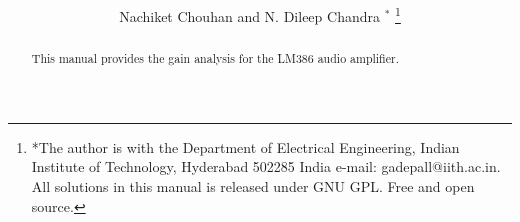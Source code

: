 \documentclass[journal,12pt,twocolumn]{IEEEtran}
\renewcommand\thesection{\arabic{section}}
\begin{document}
\makeatletter
{}
\makeatother
\let\StandardTheFigure\thefigure
\renewcommand{\thefigure}{\thesection}
\makeatletter
{}
\makeatother
\let\StandardTheFigure\thefigure
\let\StandardTheTable\thetable
\let\vec\mathbf
\def\putbox#1#2#3{\makebox[0in][l]{\makebox[#1][l]{}\raisebox{\baselineskip}[0in][0in]{\raisebox{#2}[0in][0in]{#3}}}}
     \def\rightbox#1{\makebox[0in][r]{#1}}
     \def\centbox#1{\makebox[0in]{#1}}
     \def\topbox#1{\raisebox{-\baselineskip}[0in][0in]{#1}}
     \def\midbox#1{\raisebox{-0.5\baselineskip}[0in][0in]{#1}}
\vspace{3cm}
\title{ 
}
\author{ Nachiket Chouhan and N. Dileep Chandra $^{*}$%
	\thanks{*The author is with the Department
		of Electrical Engineering, Indian Institute of Technology, Hyderabad
		502285 India e-mail:  gadepall@iith.ac.in. All solutions in this manual is released under GNU 
GPL.  Free and open source.}
	
}
\maketitle
\tableofcontents
\bigskip
\renewcommand{\thefigure}{\theenumi}
\renewcommand{\thetable}{\theenumi}
\begin{abstract}
This manual provides the gain analysis for the LM386 audio amplifier. 
\end{abstract}
\end{document}
